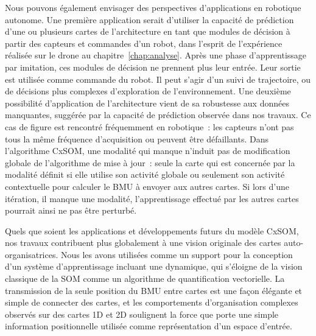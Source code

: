 Nous pouvons également envisager des perspectives d'applications en robotique autonome.
Une première application serait d'utiliser la capacité de prédiction d'une ou plusieurs cartes de l'architecture en tant que modules de décision à partir des capteurs et commandes d'un robot, dans l'esprit de l'expérience réalisée sur le drone au chapitre~\ref{chap:analyse}.
Après une phase d'apprentissage par imitation, ces modules de décision ne prennent plus leur entrée. Leur sortie est utilisée comme commande du robot. Il peut s'agir d'un suivi de trajectoire, ou de décisions plus complexes d'exploration de l'environnement.
Une deuxième possibilité d'application de l'architecture vient de sa robustesse aux données manquantes, suggérée par la capacité de prédiction observée dans nos travaux.
Ce cas de figure est rencontré fréquemment en robotique~: les capteurs n'ont pas tous la même fréquence d'acquisition ou peuvent être défaillants. 
Dans l'algorithme CxSOM, une modalité qui manque n'induit pas de modification globale de l'algorithme de mise à jour~: seule la carte qui est concernée par la modalité définit si elle utilise son activité globale ou seulement son activité contextuelle pour calculer le BMU à envoyer aux autres cartes.
Si lors d'une itération, il manque une modalité, l'apprentissage effectué par les autres cartes pourrait ainsi ne pas être perturbé.


Quels que soient les applications et développements futurs du modèle CxSOM, nos travaux contribuent plus globalement à une vision originale des cartes auto-organisatrices. Nous les avons utilisées comme un support pour la conception d'un système d'apprentissage incluant une dynamique, qui s'éloigne de la vision classique de la SOM comme un algorithme de quantification vectorielle.
La transmission de la seule position du BMU entre cartes est une façon élégante et simple de connecter des cartes, et les comportements d'organisation complexes observés sur des cartes 1D et 2D soulignent la force que porte une simple information positionnelle utilisée comme représentation d'un espace d'entrée.



